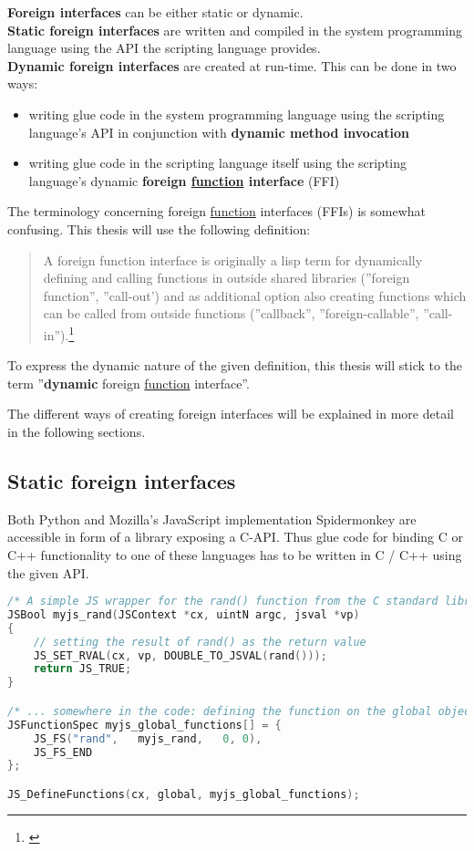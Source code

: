 \textbf{Foreign interfaces} can be either static or dynamic.\\
\textbf{Static foreign interfaces} are written and compiled in the system programming language using the API the scripting language provides.\\
\textbf{Dynamic foreign interfaces} are created at run-time. This can be done in two ways:
\begin{itemize}
\item writing glue code in the system programming language using the scripting language's API in conjunction with \textbf{dynamic method invocation}
\item writing glue code in the scripting language itself using the scripting language's dynamic \textbf{foreign \underline{function} interface} (FFI)
\end{itemize}

The terminology concerning foreign \underline{function} interfaces (FFIs) is somewhat confusing. This thesis will use the following definition:

\begin{quotation}
A foreign function interface is originally a lisp term for dynamically defining and calling functions in outside shared libraries (''foreign function'', ''call-out') and as additional option also creating functions which can be called from outside functions (''callback'', ''foreign-callable'', ''call-in'').\footnote{\citep{DesignFFI}}
\end{quotation}

To express the dynamic nature of the given definition, this thesis will stick to the term ''\textbf{dynamic} foreign \underline{function} interface''.

The different ways of creating foreign interfaces will be explained in more detail in the following sections.

\subsection{Static foreign interfaces}

Both Python and Mozilla's JavaScript implementation Spidermonkey are accessible in form of a library exposing a C-API. Thus glue code for binding C or C++ functionality to one of these languages has to be written in C / C++ using the given API.

\SingleSpacing
\begin{lstlisting}[language=C++, caption=Exposing a C function to Spidermonkey]
/* A simple JS wrapper for the rand() function from the C standard library */
JSBool myjs_rand(JSContext *cx, uintN argc, jsval *vp)
{
    // setting the result of rand() as the return value
    JS_SET_RVAL(cx, vp, DOUBLE_TO_JSVAL(rand()));
    return JS_TRUE;
}

/* ... somewhere in the code: defining the function on the global object so it can be used from the script */
JSFunctionSpec myjs_global_functions[] = {
    JS_FS("rand",   myjs_rand,   0, 0),
    JS_FS_END
};

JS_DefineFunctions(cx, global, myjs_global_functions);
\end{lstlisting}
\OnehalfSpacing

